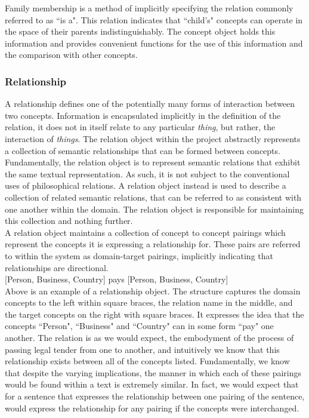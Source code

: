 \documentclass[12pt]{article} %
\begin{document}
Family membership is a method of implicitly specifying the relation commonly referred to as ``is a". This relation indicates that ``child's" concepts can operate in the space of their parents indistinguishably. The concept object holds this information and provides convenient functions for the use of this information and the comparison with other concepts.

\subsubsection{Relationship}

A relationship defines one of the potentially many forms of interaction between two concepts. Information is encapsulated implicitly in the definition of the relation, it does not in itself relate to any particular \textit{thing}, but rather, the interaction of \textit{things}. The relation object within the project abstractly represents a collection of semantic relationships that can be formed between concepts. Fundamentally, the relation object is to represent semantic relations that exhibit the same textual representation. As such, it is not subject to the conventional uses of philosophical relations. A relation object instead is used to describe a collection of related semantic relations, that can be referred to as consistent with one another within the domain. The relation object is responsible for maintaining this collection and nothing further.\\

A relation object maintains a collection of concept to concept pairings which represent the concepts it is expressing a relationship for. These pairs are referred to within the system as domain-target pairings, implicitly indicating that relationships are directional.\\ 


[Person, Business, Country] pays [Person, Business, Country]\\


Above is an example of a relationship object. The structure captures the domain concepts to the left within square braces, the relation name in the middle, and the target concepts on the right with square braces. It expresses the idea that the concepts ``Person", ``Business" and ``Country" can in some form ``pay" one another. The relation is as we would expect, the embodyment of the process of passing legal tender from one to another, and intuitively we know that this relationship exists between all of the concepts listed. Fundamentally, we know that despite the varying implications, the manner in which each of these pairings would be found within a text is extremely similar. In fact, we would expect that for a sentence that expresses the relationship between one pairing of the sentence, would express the relationship for any pairing if the concepts were interchanged.\\
\end{document}

